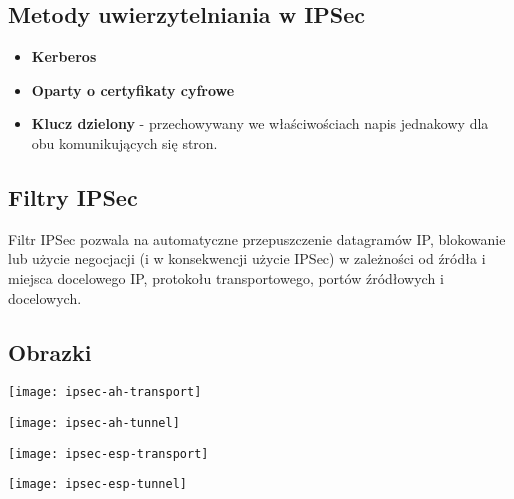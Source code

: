 \documentclass[../sk-egzamin.tex]{subfiles}
\begin{document}
\subsection*{Metody uwierzytelniania w IPSec}
\begin{itemize}
    \item \textbf{Kerberos}
    \item \textbf{Oparty o certyfikaty cyfrowe}
    \item \textbf{Klucz dzielony} - przechowywany we właściwościach napis
    jednakowy dla obu komunikujących się stron.
\end{itemize}

\subsection*{Filtry IPSec}

Filtr IPSec pozwala na automatyczne przepuszczenie datagramów IP, blokowanie
lub użycie negocjacji (i w konsekwencji użycie IPSec) w zależności od źródła i
miejsca docelowego IP, protokołu transportowego, portów źródłowych i docelowych.

\subsection*{Obrazki}

\texttt{[image: ipsec-ah-transport]}

\texttt{[image: ipsec-ah-tunnel]}

\texttt{[image: ipsec-esp-transport]}

\texttt{[image: ipsec-esp-tunnel]}

\pagebreak
\end{document}
